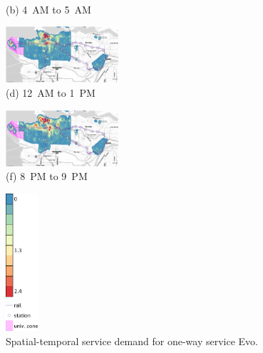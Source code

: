 \begin{figure}[hhh!!]
\begin{minipage}[b]{0.3\linewidth}
\begin{minipage}[b]{\linewidth}
           {\\(b) 4~AM to 5~AM}
         \end{minipage}
         \begin{minipage}[b]{\linewidth}
           \centering
           \hspace*{-0.1cm}
           \includegraphics[width=42mm]{evo_heatmaps/min/hora12.pdf}
           {\\(d) 12~AM to 1~PM}
         \end{minipage}
         \begin{minipage}[b]{\linewidth}
           \hspace*{-0.1cm}
           \centering
           \includegraphics[width=42mm]{evo_heatmaps/min/hora20.pdf}
           {\\(f) 8~PM to 9~PM}
         \end{minipage}
   \end{minipage}
   \begin{minipage}[b]{0.1\linewidth}
   \centering
   		 \hspace*{12mm}
   		 \includegraphics[width=12mm]{evo_heatmaps/legenda_evo.pdf}
         \vspace{17mm}
   \end{minipage}
   \caption{Spatial-temporal service demand for one-way service Evo.}
   \label{fig:heat_evo}
\end{figure}

